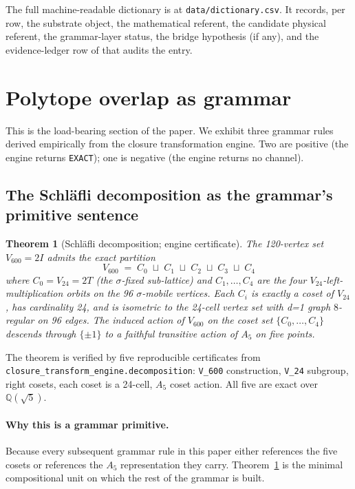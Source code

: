 \documentclass[11pt,a4paper]{article}
\newtheorem{theorem}{Theorem}
\newcommand{\Vsix}{V_{600}}
\newcommand{\Vtf}{V_{24}}
\newcommand{\Q}{\mathbb{Q}}
\begin{document}
The full machine-readable dictionary is at
\texttt{data/dictionary.csv}. It records, per row, the substrate
object, the mathematical referent, the candidate physical
referent, the grammar-layer status, the bridge hypothesis (if
any), and the evidence-ledger row of \cite{evidenceLedger} that
audits the entry.

\section{Polytope overlap as grammar}
\label{sec:grammar}

This is the load-bearing section of the paper. We exhibit three
grammar rules derived empirically from the closure transformation
engine. Two are positive (the engine returns
\texttt{EXACT}); one is negative (the engine returns no channel).

\subsection{The Schl\"afli decomposition as the grammar's primitive
sentence}
\label{sec:grammar:schlafli}

\begin{theorem}[Schl\"afli decomposition; engine certificate]
\label{thm:schlafli}
The 120-vertex set $\Vsix = 2I$ admits the exact partition
\[
  \Vsix \;=\; C_0 \;\sqcup\; C_1 \;\sqcup\; C_2 \;\sqcup\; C_3 \;\sqcup\; C_4
\]
where $C_0 = \Vtf = 2T$ (the $\sigma$-fixed sub-lattice) and
$C_1, \ldots, C_4$ are the four $\Vtf$-left-multiplication orbits
on the 96 $\sigma$-mobile vertices. Each $C_i$ is exactly a coset of
$\Vtf$, has cardinality 24, and is isometric to the 24-cell vertex
set with d=1 graph $8$-regular on 96 edges. The induced action of
$\Vsix$ on the coset set $\{C_0, \ldots, C_4\}$ descends through
$\{\pm 1\}$ to a faithful transitive action of $A_5$ on five
points.
\end{theorem}

The theorem is verified by five reproducible certificates from
\texttt{closure\_transform\_engine.decomposition}: \texttt{V\_600}
construction, \texttt{V\_24} subgroup, right cosets, each coset
is a 24-cell, $A_5$ coset action. All five are exact over
$\Q(\sqrt 5)$.

\paragraph{Why this is a grammar primitive.} Because every
subsequent grammar rule in this paper either references the five
cosets or references the $A_5$ representation they carry.
Theorem~\ref{thm:schlafli} is the minimal compositional unit on
which the rest of the grammar is built.
\end{document}
